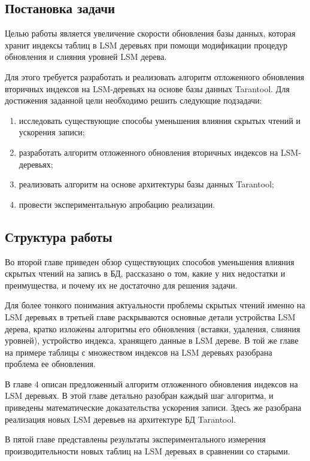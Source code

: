 \documentclass[a4paper,hidelinks,12pt]{article}
\begin{document}
\subsection{Постановка задачи}
Целью работы является увеличение скорости обновления базы данных, которая
хранит индексы таблиц в LSM деревьях при помощи модификации процедур обновления
и слияния уровней LSM дерева.

Для этого требуется разработать и реализовать алгоритм отложенного обновления
вторичных индексов на LSM-деревьях на основе базы данных Tarantool. Для
достижения заданной цели необходимо решить следующие подзадачи:
\begin{enumerate}
\item исследовать существующие способы уменьшения влияния скрытых чтений и
      ускорения записи;
\item разработать алгоритм отложенного обновления вторичных индексов на
      LSM-деревьях;
\item реализовать алгоритм на основе архитектуры базы данных Tarantool;
\item провести экспериментальную апробацию реализации.
\end{enumerate}

\subsection{Структура работы}
Во второй главе приведен обзор существующих способов уменьшения влияния скрытых
чтений на запись в БД, рассказано о том, какие у них недостатки и преимущества,
и почему их не достаточно для решения задачи.

Для более тонкого понимания актуальности проблемы скрытых чтений именно на LSM
деревьях в третьей главе раскрываются основные детали устройства LSM дерева,
кратко изложены алгоритмы его обновления (вставки, удаления, слияния уровней),
устройство индекса, хранящего данные в LSM дереве. В той же главе на примере
таблицы с множеством индексов на LSM деревьях разобрана проблема ее обновления.

В главе 4 описан предложенный алгоритм отложенного обновления индексов на LSM
деревьях. В этой главе детально разобран каждый шаг алгоритма, и приведены
математические доказательства ускорения записи. Здесь же разобрана реализация
новых LSM деревьев на архитектуре БД Tarantool.

В пятой главе представлены результаты экспериментального измерения
производительности новых таблиц на LSM деревьях в сравнении со старыми.
\end{document}
